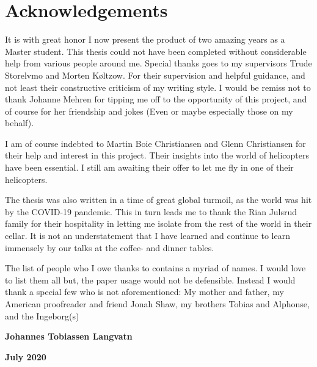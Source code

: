 \chapter*{Acknowledgements}
It is with great honor I now present the product of two amazing years as a Master student. This thesis could not have been completed without considerable help from various people around me. Special thanks goes to my supervisors Trude Storelvmo and Morten Køltzow. For their supervision and helpful guidance, and not least their constructive criticism of my writing style. I would be remiss not to thank Johanne Mehren for tipping me off to the opportunity of this project, and of course for her friendship and jokes (Even or maybe especially those on my behalf).

I am of course indebted to Martin Boie Christiansen and Glenn Christiansen for their help and interest in this project. Their insights into the world of helicopters have been essential. I still am awaiting their offer to let me fly in one of their helicopters. 

The thesis was also written in a time of great global turmoil, as the world was hit by the COVID-19 pandemic. This in turn leads me to thank the Rian Julsrud family for their hospitality in letting me isolate from the rest of the world in their cellar. It is not an understatement that I have learned and continue to learn immensely by our talks at the coffee- and dinner tables.

The list of people who I owe thanks to contains a myriad of names. I would love to list them all but, the paper usage would not be defensible. Instead I would thank a special few who is not aforementioned: My mother and father, my American proofreader and friend Jonah Shaw, my brothers Tobias and Alphonse, and the Ingeborg(s) \\

\begin{center}
\textbf{Johannes Tobiassen Langvatn}
\end{center}
\begin{center}
\textbf{July 2020}
\end{center}

